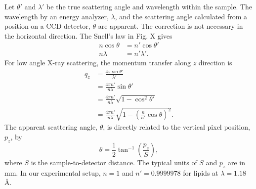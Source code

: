Let $\theta'$ and $\lambda'$ be the true scattering angle and wavelength
within the sample. The wavelength by an energy analyzer, $\lambda$, and the 
scattering angle calculated from a position on a CCD detector, $\theta$ are 
apparent. The correction is not necessary in the horizontal direction.
The Snell's law in Fig. X gives
\begin{align}
  n\cos\theta &= n'\cos\theta' \\
  n\lambda &= n'\lambda'.
\end{align}
For low angle X-ray scattering, the momentum transfer along $z$ direction is
\begin{align}
  q_z &= \frac{4\pi\sin\theta'}{\lambda'} \\
      &= \frac{4\pi n'}{n\lambda}\sin\theta' \\
      &= \frac{4\pi n'}{n\lambda}\sqrt{1-\cos^2\theta'} \\
      &= \frac{4\pi n'}{n\lambda}\sqrt{1-\left(\frac{n}{n'}\cos\theta\right)^2}.
\end{align}
The apparent scattering angle, $\theta$, is directly related to the vertical
pixel position, $p_z$, by 
\begin{equation}
  \theta = \frac{1}{2}\tan^{-1}\left(\frac{p_z}{S}\right),
\end{equation}
where $S$ is the sample-to-detector distance. The typical units of $S$ and 
$p_z$ are in mm. In our experimental setup,
$n=1$ and $n'=0.9999978$ for lipids at $\lambda=1.18$ \AA. 
